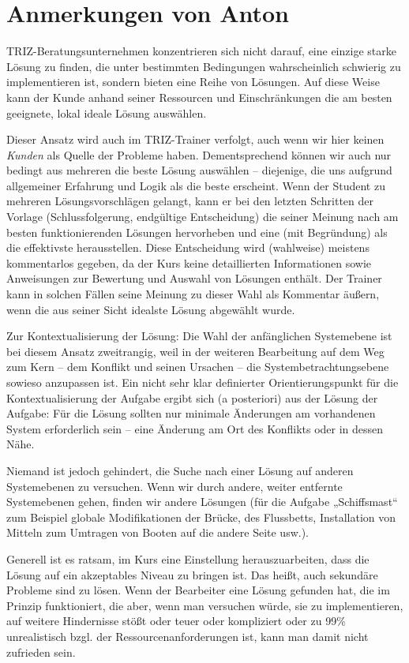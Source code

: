 \documentclass[11pt,a4paper]{article}
\begin{document}
\section{Anmerkungen von Anton}

TRIZ-Beratungsunternehmen konzentrieren sich nicht darauf, eine einzige starke
Lösung zu finden, die unter bestimmten Bedingungen wahrscheinlich schwierig zu
implementieren ist, sondern bieten eine Reihe von Lösungen. Auf diese Weise
kann der Kunde anhand seiner Ressourcen und Einschränkungen die am besten
geeignete, lokal ideale Lösung auswählen.
 
Dieser Ansatz wird auch im TRIZ-Trainer verfolgt, auch wenn wir hier keinen
\emph{Kunden} als Quelle der Probleme haben. Dementsprechend können wir auch
nur bedingt aus mehreren die beste Lösung auswählen -- diejenige, die uns
aufgrund allgemeiner Erfahrung und Logik als die beste erscheint. Wenn der
Student zu mehreren Lösungsvorschlägen gelangt, kann er bei den letzten
Schritten der Vorlage (Schlussfolgerung, endgültige Entscheidung) die seiner
Meinung nach am besten funktionierenden Lösungen hervorheben und eine (mit
Begründung) als die effektivste herausstellen. Diese Entscheidung wird
(wahlweise) meistens kommentarlos gegeben, da der Kurs keine detaillierten
Informationen sowie Anweisungen zur Bewertung und Auswahl von Lösungen
enthält. Der Trainer kann in solchen Fällen seine Meinung zu dieser Wahl als
Kommentar äußern, wenn die aus seiner Sicht idealste Lösung abgewählt wurde.
 
Zur Kontextualisierung der Lösung: Die Wahl der anfänglichen Systemebene ist
bei diesem Ansatz zweitrangig, weil in der weiteren Bearbeitung auf dem Weg
zum Kern -- dem Konflikt und seinen Ursachen -- die Systembetrachtungsebene
sowieso anzupassen ist. Ein nicht sehr klar definierter Orientierungspunkt für
die Kontextualisierung der Aufgabe ergibt sich (a posteriori) aus der Lösung
der Aufgabe: Für die Lösung sollten nur minimale Änderungen am vorhandenen
System erforderlich sein -- eine Änderung am Ort des Konflikts oder in dessen
Nähe.

Niemand ist jedoch gehindert, die Suche nach einer Lösung auf anderen
Systemebenen zu versuchen. Wenn wir durch andere, weiter entfernte
Systemebenen gehen, finden wir andere Lösungen (für die Aufgabe „Schiffsmast“
zum Beispiel globale Modifikationen der Brücke, des Flussbetts, Installation
von Mitteln zum Umtragen von Booten auf die andere Seite usw.).

Generell ist es ratsam, im Kurs eine Einstellung herauszuarbeiten, dass die
Lösung auf ein akzeptables Niveau zu bringen ist. Das heißt, auch sekundäre
Probleme sind zu lösen.  Wenn der Bearbeiter eine Lösung gefunden hat, die im
Prinzip funktioniert, die aber, wenn man versuchen würde, sie zu
implementieren, auf weitere Hindernisse stößt oder teuer oder kompliziert oder
zu 99\% unrealistisch bzgl. der Ressourcenanforderungen ist, kann man damit
nicht zufrieden sein.
\end{document}

